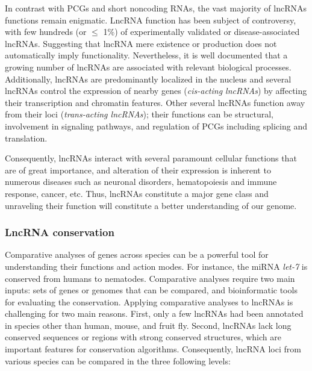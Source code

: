 In contrast with PCGs and short noncoding RNAs, the vast majority of lncRNAs functions remain enigmatic. LncRNA function has been subject of controversy, with few hundreds (or $\le$ 1\%) of experimentally validated or disease-associated lncRNAs.\autocite{uszczynska2018} Suggesting that lncRNA mere existence or production does not automatically imply functionality. Nevertheless, it is well documented that a growing number of lncRNAs are associated with relevant biological processes.\autocite{statello_2021_lncRNA_reg,kopp_2018_functional,li_2019_insights} Additionally, lncRNAs are predominantly localized in the nucleus and several lncRNAs control the expression of nearby genes (\textit{cis-acting lncRNAs}) by affecting their transcription and chromatin features. Other several lncRNAs function away from their loci (\textit{trans-acting lncRNAs}); their functions can be structural, involvement in signaling pathways, and regulation of PCGs including splicing and translation.

Consequently, lncRNAs interact with several paramount cellular functions that are of great importance, and alteration of their expression is inherent to numerous diseases such as neuronal disorders, hematopoiesis and immune response, cancer, etc. Thus, lncRNAs constitute a major gene class and unraveling their function will constitute a better understanding of our genome. 

\subsubsection{LncRNA conservation}
\label{subsubsec:conservation_lncRNAs}

Comparative analyses of genes across species can be a powerful tool for understanding their functions and action modes. For instance, the miRNA \textit{let-7} is conserved from humans to nematodes.\autocite{pasquinelli_2000_let} Comparative analyses require two main inputs: sets of genes or genomes that can be compared, and bioinformatic tools for evaluating the conservation. Applying comparative analyses to lncRNAs is challenging for two main reasons. First, only a few lncRNAs had been annotated in species other than human, mouse, and fruit fly. Second, lncRNAs lack long conserved sequences or regions with strong conserved structures, which are important features for conservation algorithms. Consequently, lncRNA loci from various species can be compared in the three following levels:

